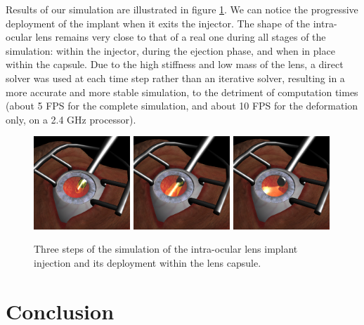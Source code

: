\documentclass{llncs}
\begin{document}
Results of our simulation are illustrated in figure \ref{fig-simu-results}. We can notice the progressive deployment of the implant when it exits the injector.  The shape of the intra-ocular lens remains very close to that of a real one during all stages of the simulation: within the injector, during the ejection phase, and when in place within the capsule. Due to the high stiffness and low mass of the lens, a direct solver was used at each time step rather than an iterative solver, resulting in a more accurate and more stable simulation, to the detriment of computation times (about 5 FPS for the complete simulation, and about 10 FPS for the deformation only, on a 2.4 GHz processor).

\begin{figure}[!h]
\centering
\includegraphics[height=3.5cm]{images/simu_injection_step_1}
\hfill
\includegraphics[height=3.5cm]{images/simu_injection_step_2}
\hfill
\includegraphics[height=3.5cm]{images/simu_injection_step_3}
\caption [Lens imlant] {Three steps of the simulation of the intra-ocular lens implant injection and its deployment within the lens capsule.}
\label{fig-simu-results}
\end{figure}

\section{Conclusion}
\end{document}
